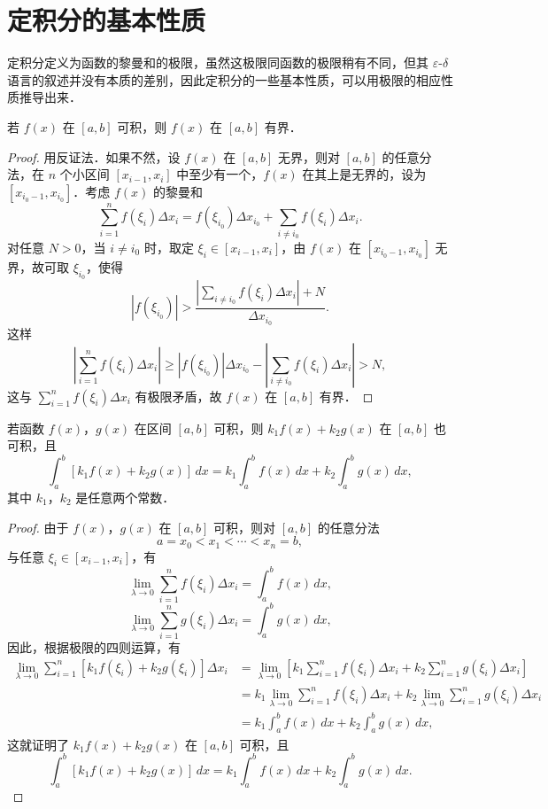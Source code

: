 \section{定积分的基本性质}\label{sec:7-2}

定积分定义为函数的黎曼和的极限，虽然这极限同函数的极限稍有不同，但其 $\varepsilon$-$\delta$ 语言的叙述并没有本质的差别，因此定积分的一些基本性质，可以用极限的相应性质推导出来．

\begin{theorem}[可积函数必有界]\label{thm:7-1}
若 $f(x)$ 在 $[a,b]$ 可积，则 $f(x)$ 在 $[a,b]$ 有界．
\end{theorem}

\begin{proof}
用反证法．如果不然，设 $f(x)$ 在 $[a,b]$ 无界，则对 $[a,b]$ 的任意分法，在 $n$ 个小区间 $[x_{i-1}, x_i]$ 中至少有一个，$f(x)$ 在其上是无界的，设为 $[x_{i_0-1}, x_{i_0}]$．考虑 $f(x)$ 的黎曼和
\[
\sum_{i=1}^n f(\xi_i)\Delta x_i = f(\xi_{i_0})\Delta x_{i_0} + \sum_{i \neq i_0} f(\xi_i)\Delta x_i.
\]
对任意 $N > 0$，当 $i \neq i_0$ 时，取定 $\xi_i \in [x_{i-1}, x_i]$，由 $f(x)$ 在 $[x_{i_0-1}, x_{i_0}]$ 无界，故可取 $\xi_{i_0}$，使得
\[
|f(\xi_{i_0})| > \frac{\left|\sum_{i \neq i_0} f(\xi_i)\Delta x_i\right| + N}{\Delta x_{i_0}}.
\]
这样
\[
\left|\sum_{i=1}^n f(\xi_i)\Delta x_i\right| \geqslant |f(\xi_{i_0})|\Delta x_{i_0} - \left|\sum_{i \neq i_0} f(\xi_i)\Delta x_i\right| > N,
\]
这与 $\sum_{i=1}^n f(\xi_i)\Delta x_i$ 有极限矛盾，故 $f(x)$ 在 $[a,b]$ 有界．
\end{proof}

\begin{theorem}[定积分的线性性质]\label{thm:7-2}
若函数 $f(x)$，$g(x)$ 在区间 $[a,b]$ 可积，则 $k_1 f(x) + k_2 g(x)$ 在 $[a,b]$ 也可积，且
\[
\int_a^b \left[k_1 f(x) + k_2 g(x)\right]\,dx = k_1 \int_a^b f(x)\,dx + k_2 \int_a^b g(x)\,dx,
\]
其中 $k_1$，$k_2$ 是任意两个常数．
\end{theorem}

\begin{proof}
由于 $f(x)$，$g(x)$ 在 $[a,b]$ 可积，则对 $[a,b]$ 的任意分法
\[
a = x_0 < x_1 < \cdots < x_n = b,
\]
与任意 $\xi_i \in [x_{i-1}, x_i]$，有
\[
\lim_{\lambda \to 0}\sum_{i=1}^n f(\xi_i)\Delta x_i = \int_a^b f(x)\,dx,
\]
\[
\lim_{\lambda \to 0}\sum_{i=1}^n g(\xi_i)\Delta x_i = \int_a^b g(x)\,dx,
\]
因此，根据极限的四则运算，有
\begin{align*}
\lim_{\lambda \to 0}\sum_{i=1}^n \left[k_1 f(\xi_i) + k_2 g(\xi_i)\right]\Delta x_i &= \lim_{\lambda \to 0}\left[k_1 \sum_{i=1}^n f(\xi_i)\Delta x_i + k_2 \sum_{i=1}^n g(\xi_i)\Delta x_i\right] \\
&= k_1 \lim_{\lambda \to 0}\sum_{i=1}^n f(\xi_i)\Delta x_i + k_2 \lim_{\lambda \to 0}\sum_{i=1}^n g(\xi_i)\Delta x_i \\
&= k_1 \int_a^b f(x)\,dx + k_2 \int_a^b g(x)\,dx,
\end{align*}
这就证明了 $k_1 f(x) + k_2 g(x)$ 在 $[a,b]$ 可积，且
\[
\int_a^b \left[k_1 f(x) + k_2 g(x)\right]\,dx = k_1 \int_a^b f(x)\,dx + k_2 \int_a^b g(x)\,dx.
\]
\end{proof}

